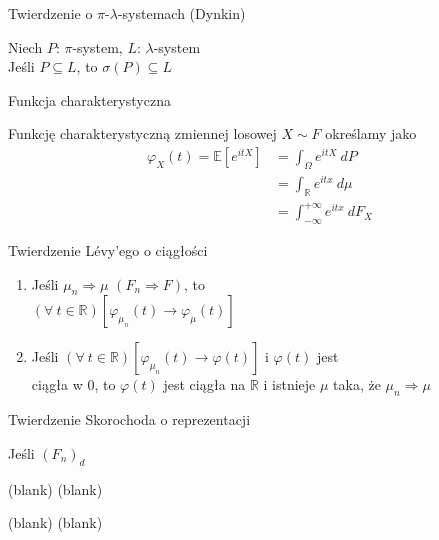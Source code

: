 \documentclass[avery5371,grid,frame]{flashcards}
\begin{document}
\begin{flashcard}[Twierdzenie]{Twierdzenie o $\pi$-$\lambda$-systemach (Dynkin)}

\smallskip
Niech $\mathit{P}$: $\pi$-system, $\mathit{L}$: $\lambda$-system \\
Jeśli $\mathit{P} \subseteq \mathit{L}$, to $\sigma(\mathit{P}) \subseteq \mathit{L}$
\end{flashcard}

\begin{flashcard}[Definicja]{Funkcja charakterystyczna}

\smallskip
Funkcję charakterystyczną zmiennej losowej $X \sim F$ określamy jako
{\begin{align*}
\varphi_X(t) = \mathbb{E} \left[ e^{itX} \right] &= \int_{\Omega} e^{itX} \ dP \\
             &= \int_{\mathbb{R}} e^{itx} \ d \mu \\
             &= \int_{-\infty}^{+\infty} e^{itx} \ dF_X 
\end{align*}}
\end{flashcard}

\begin{flashcard}[Twierdzenie]{Twierdzenie Lévy'ego o ciągłości}

\smallskip
\begin{enumerate}
\item Jeśli $\mu_n \Rightarrow \mu$ $(F_n \Rightarrow F)$, to \\ 
$(\forall \ t \in \mathbb{R})\left[\varphi_{\mu_n}(t) \rightarrow \varphi_\mu(t) \right]$
\item Jeśli $(\forall \ t \in \mathbb{R})\left[\varphi_{\mu_n}(t) \rightarrow \varphi(t) \right]$ i $\varphi(t)$ jest \\ ciągła w $0$, to $\varphi(t)$ jest ciągła na $\mathbb{R}$ i istnieje $\mu$ taka, że $\mu_n \Rightarrow \mu$
\end{enumerate}
\end{flashcard}

\begin{flashcard}[Twierdzenie]{Twierdzenie Skorochoda o reprezentacji}

\smallskip
Jeśli $(F_n)_d$
\end{flashcard}
\begin{flashcard}[Twierdzenie]{(blank)}
(blank)
\end{flashcard}
\begin{flashcard}[Twierdzenie]{(blank)}
(blank)
\end{flashcard}
\end{document}
